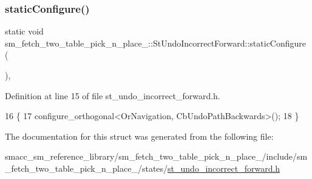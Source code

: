 \subsubsection{\texorpdfstring{static\+Configure()}{staticConfigure()}}
{\footnotesize\ttfamily static void sm\+\_\+fetch\+\_\+two\+\_\+table\+\_\+pick\+\_\+n\+\_\+place\+\_\+::\+St\+Undo\+Incorrect\+Forward\+::static\+Configure (\begin{DoxyParamCaption}{ }\end{DoxyParamCaption})\hspace{0.3cm}{\ttfamily [inline]}, {\ttfamily [static]}}



Definition at line 15 of file st\+\_\+undo\+\_\+incorrect\+\_\+forward.\+h.


\begin{DoxyCode}
16         \{
17             configure\_orthogonal<OrNavigation, CbUndoPathBackwards>();
18         \}
\end{DoxyCode}


The documentation for this struct was generated from the following file\+:\begin{DoxyCompactItemize}
\item 
smacc\+\_\+sm\+\_\+reference\+\_\+library/sm\+\_\+fetch\+\_\+two\+\_\+table\+\_\+pick\+\_\+n\+\_\+place\+\_/include/sm\+\_\+fetch\+\_\+two\+\_\+table\+\_\+pick\+\_\+n\+\_\+place\+\_/states/\hyperlink{st__undo__incorrect__forward_8h}{st\+\_\+undo\+\_\+incorrect\+\_\+forward.\+h}\end{DoxyCompactItemize}
